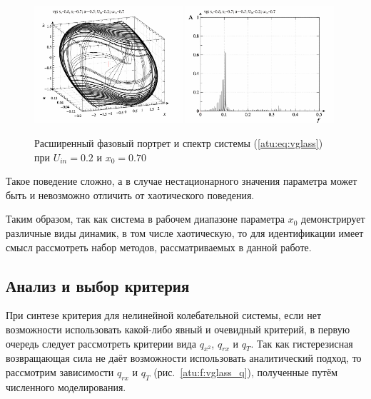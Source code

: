 \begin{figure}[ht!]
\begin{center}
  \includegraphics[width=0.49\textwidth]{p/cha/vg/vg_0-p_phe_0x20_0x70_0x70.png}
  \hfill
  \includegraphics[width=0.49\textwidth]{p/cha/vg/vg_fft-p_f_0x20_0x70_0x70.png}
\end{center}
  \caption{Расширенный фазовый портрет и спектр системы (\ref{atu:eq:vglass}) при $U_{in}=0.2$ и $x_0=0.70$}
\label{atu:f:vglass_phase_f_u12}
\end{figure}

Такое поведение сложно, а в случае нестационарного значения параметра
может быть и невозможно отличить от хаотического поведения.

Таким образом, так как система в рабочем диапазоне параметра
$x_0$ демонстрирует различные виды динамик, в том числе хаотическую,
то для идентификации имеет смысл рассмотреть набор методов,
рассматриваемых в данной работе.


\subsection{Анализ и выбор критерия}  %

При синтезе критерия для нелинейной колебательной системы,
если нет возможности использовать
какой-либо явный и очевидный критерий,
в первую очередь следует рассмотреть
критерии вида $q_{x^2}$, $q_{rx}$ и $q_T$.
Так как гистерезисная возвращающая сила
не даёт возможности использовать аналитический
подход, то рассмотрим
зависимости $q_{rx}$ и $q_T$
(рис.~\ref{atu:f:vglass_q}),
полученные путём численного моделирования.

